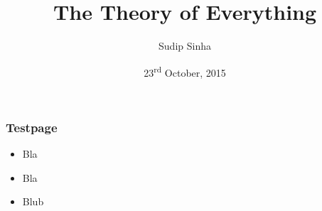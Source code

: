 \documentclass{beamer}
\title{The Theory of Everything}
\author{Sudip Sinha}
\date[2015-10-23]{23\textsuperscript{rd} October, 2015}
\institute{MathMods}
\begin{document}
\ECFAugie

\begin{frame}[plain]
    \maketitle
\end{frame}

\begin{frame}[t]
    \frametitle{Testpage}
    \begin{itemize}
        \item Bla
        \item Bla
        \item Blub
    \end{itemize}
\end{frame}
\end{document}
